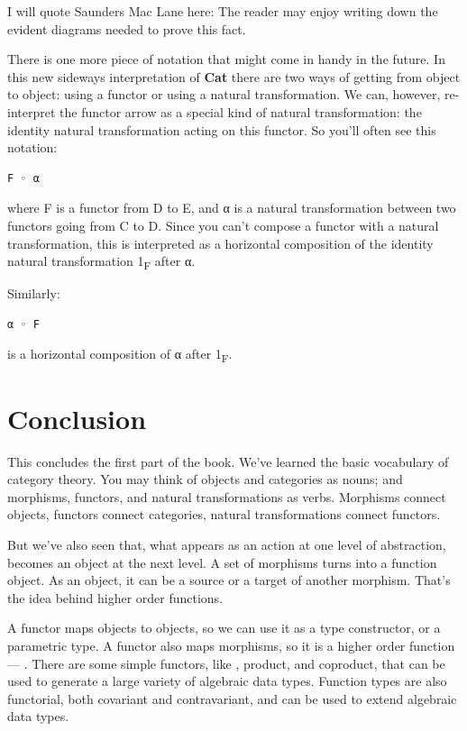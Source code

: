 I will quote Saunders Mac Lane here: The reader may enjoy writing down
the evident diagrams needed to prove this fact.

There is one more piece of notation that might come in handy in the
future. In this new sideways interpretation of \textbf{Cat} there are
two ways of getting from object to object: using a functor or using a
natural transformation. We can, however, re-interpret the functor arrow
as a special kind of natural transformation: the identity natural
transformation acting on this functor. So you'll often see this
notation:

\begin{Verbatim}[commandchars=\\\{\}]
F ◦ α
\end{Verbatim}
where F is a functor from D to E, and α is a natural transformation
between two functors going from C to D. Since you can't compose a
functor with a natural transformation, this is interpreted as a
horizontal composition of the identity natural transformation
1\textsubscript{F} after α.

Similarly:

\begin{Verbatim}[commandchars=\\\{\}]
α ◦ F
\end{Verbatim}
is a horizontal composition of α after 1\textsubscript{F}.

\section{Conclusion}\label{conclusion}

This concludes the first part of the book. We've learned the basic
vocabulary of category theory. You may think of objects and categories
as nouns; and morphisms, functors, and natural transformations as verbs.
Morphisms connect objects, functors connect categories, natural
transformations connect functors.

But we've also seen that, what appears as an action at one level of
abstraction, becomes an object at the next level. A set of morphisms
turns into a function object. As an object, it can be a source or a
target of another morphism. That's the idea behind higher order
functions.

A functor maps objects to objects, so we can use it as a type
constructor, or a parametric type. A functor also maps morphisms, so it
is a higher order function --- . There are some simple
functors, like , product, and coproduct, that can be used
to generate a large variety of algebraic data types. Function types are
also functorial, both covariant and contravariant, and can be used to
extend algebraic data types.

